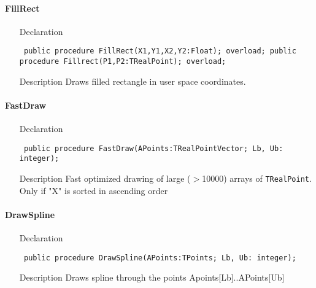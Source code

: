 \documentclass[12pt,a4paper,oneside]{report}
\newcommand{\declarationitem}[1]{{\addfontfeatures{FakeBold=1.3} #1}}
\newcommand{\descriptiontitle}[1]{{\addfontfeatures{FakeSlant}#1}}
\newcommand{\code}[1]{\texttt{#1}}
\begin{document}
\paragraph{FillRect}\hspace*{\fill}
\label{lmcoordsys.TCoordSys-FillRect}
\begin{itemize}\item[\declarationitem{Declaration}\hfill]
\begin{flushleft}
\code{
public procedure FillRect(X1,Y1,X2,Y2:Float); overload;
public procedure Fillrect(P1,P2:TRealPoint); overload;}
\end{flushleft}
\item[\descriptiontitle{Description}] Draws filled rectangle in user space coordinates.
\end{itemize}


\paragraph{FastDraw}\hspace*{\fill}\label{lmcoordsys.TCoordSys-FastDraw}
\begin{itemize}\item[\declarationitem{Declaration}\hfill]
\begin{flushleft}
\code{
public procedure FastDraw(APoints:TRealPointVector; Lb, Ub: integer);}
\end{flushleft}
\item[\descriptiontitle{Description}]
Fast optimized drawing of large ({$>$}10000) arrays of \code{TRealPoint}. Only if "X" is sorted in ascending order
\end{itemize}
\paragraph{DrawSpline}\hspace*{\fill}\label{lmcoordsys.TCoordSys-DrawSpline}
\begin{itemize}\item[\declarationitem{Declaration}\hfill]
\begin{flushleft}
\code{
public procedure DrawSpline(APoints:TPoints; Lb, Ub: integer);}
\end{flushleft}
\item[\descriptiontitle{Description}]
Draws spline through the points Apoints[Lb]..APoints[Ub]
\end{itemize}
\end{document}
